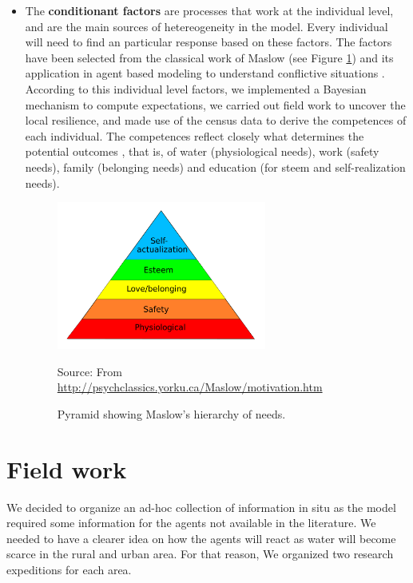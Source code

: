 \documentclass{article}
\begin{document}
\begin{itemize}
\item The {\bf conditionant factors} are processes that work at the individual level, and are the main sources of hetereogeneity in the model. Every individual will need to find an particular response based on these factors. The factors have been selected from the classical work of Maslow \cite{maslow_motivation_1987} (see Figure \ref{maslow}) and its application in agent based modeling to understand conflictive situations \cite{watkins_understanding_2008}. According to this individual level factors, we implemented a Bayesian mechanism to compute expectations, we carried out field work to uncover the local resilience, and made use of the census data to derive the competences of each individual. The competences reflect closely what determines the potential outcomes \cite{watkins_understanding_2008}, that is, of water (physiological needs), work (safety needs), family (belonging needs) and education (for steem and self-realization needs).  

  \begin{figure}[h]
    \centering
    \includegraphics[width=0.65\textwidth]{maslow}
    \caption[Hierarchy of Maslow]{Pyramid showing Maslow's hierarchy of needs.}
    Source: From \url{http://psychclassics.yorku.ca/Maslow/motivation.htm}
    \label{maslow}
  \end{figure}

\end{itemize}



\section{Field work}

We decided to organize an ad-hoc collection of information in situ as the model required some information for the agents not available in the literature. We needed to have a clearer idea on how the agents will react as water will become scarce in the rural and urban area. For that reason, We organized two research expeditions for each area.
\end{document}

